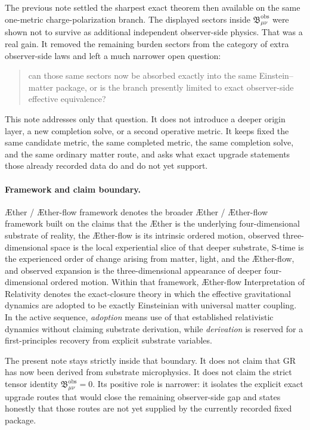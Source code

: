 \documentclass[11pt]{article}
\newcommand{\Aether}{\AE{}ther}
\newcommand{\Aflow}{\AE{}ther-flow}
\newcommand{\TheoryName}{\Aflow{} Interpretation of Relativity}
\newcommand{\TheoryProgram}{\Aether{} / \Aflow{} framework}
\newcommand{\ObsBurden}{\mathfrak B_{\mu\nu}^{\mathrm{obs}}}
\begin{document}
The previous note settled the sharpest exact theorem then available on the same one-metric charge-polarization branch. The displayed sectors inside \(\ObsBurden\) were shown not to survive as additional independent observer-side physics. That was a real gain. It removed the remaining burden sectors from the category of extra observer-side laws and left a much narrower open question:
\begin{quote}
can those same sectors now be absorbed exactly into the same Einstein--matter package, or is the branch presently limited to exact observer-side effective equivalence?
\end{quote}

This note addresses only that question. It does not introduce a deeper origin layer, a new completion solve, or a second operative metric. It keeps fixed the same candidate metric, the same completed metric, the same completion solve, and the same ordinary matter route, and asks what exact upgrade statements those already recorded data do and do not yet support.

\paragraph{Framework and claim boundary.}
\TheoryProgram{} denotes the broader \Aether{} / \Aflow{} framework built on the claims that the \Aether{} is the underlying four-dimensional substrate of reality, the \Aflow{} is its intrinsic ordered motion, observed three-dimensional space is the local experiential slice of that deeper substrate, S-time is the experienced order of change arising from matter, light, and the \Aflow{}, and observed expansion is the three-dimensional appearance of deeper four-dimensional ordered motion. Within that framework, \TheoryName{} denotes the exact-closure theory in which the effective gravitational dynamics are adopted to be exactly Einsteinian with universal matter coupling. In the active sequence, \emph{adoption} means use of that established relativistic dynamics without claiming substrate derivation, while \emph{derivation} is reserved for a first-principles recovery from explicit substrate variables.

The present note stays strictly inside that boundary. It does not claim that GR has now been derived from substrate microphysics. It does not claim the strict tensor identity \(\ObsBurden=0\). Its positive role is narrower: it isolates the explicit exact upgrade routes that would close the remaining observer-side gap and states honestly that those routes are not yet supplied by the currently recorded fixed package.
\end{document}
